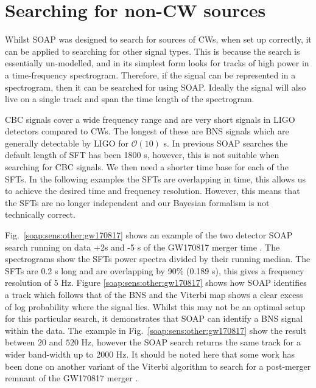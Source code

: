 \clearpage

\section{\label{soap:sens:other} Searching for non-CW sources}

Whilst SOAP was designed to search for sources of \glspl{CW}, when set up correctly, it can be applied to searching for other signal types.
This is because the search is essentially un-modelled, and in its simplest form looks for tracks of high power in a time-frequency spectrogram.
Therefore, if the signal can be represented in a spectrogram, then it can be
searched for using SOAP. 
Ideally the signal will also live on a single track and span the time length of the spectrogram. 

CBC signals cover a wide frequency range and are very short signals in \gls{LIGO} detectors compared to \glspl{CW}. 
The longest of these are \gls{BNS} signals which are generally detectable by \gls{LIGO} for $\mathcal{O}(10)$
s. 
In previous SOAP searches the default length of \gls{SFT} has been 1800 s, however, this is not suitable when searching for \gls{CBC} signals.
We then need a shorter time base for each of the \glspl{SFT}.
In the following examples the \glspl{SFT} are overlapping in time, this allows us to achieve the desired time and frequency resolution.
However, this means that the \glspl{SFT} are no longer independent and our Bayesian formalism is not technically correct.

Fig.~\ref{soap:sens:other:gw170817} shows an example of the two detector SOAP search running on data +2s and -5 s of the GW170817 merger time \citep{abbott2017GW170817Observation}. 
The spectrograms show the \glspl{SFT} power spectra divided by their
running median.
The \glspl{SFT} are 0.2 s long and are overlapping by 90\% (0.189 s), this gives a frequency resolution of 5 Hz. 
Figure \ref{soap:sens:other:gw170817} shows how SOAP identifies a track which
follows that of the \gls{BNS} and the Viterbi map shows a clear excess of log probability where the signal lies.
Whilst this may not be an optimal setup for this particular search, it demonstrates that SOAP can identify a \gls{BNS} signal within the data. 
The example in Fig.~\ref{soap:sens:other:gw170817} show the result between
$20$ and $520$ Hz, however the SOAP search returns the same track
for a wider band-width up to 2000 Hz.
It should be noted here that some work has been done on another variant of the Viterbi algorithm to search for a post-merger remnant of the GW170817 merger \citep{abbott2019SearchGravitational}.


